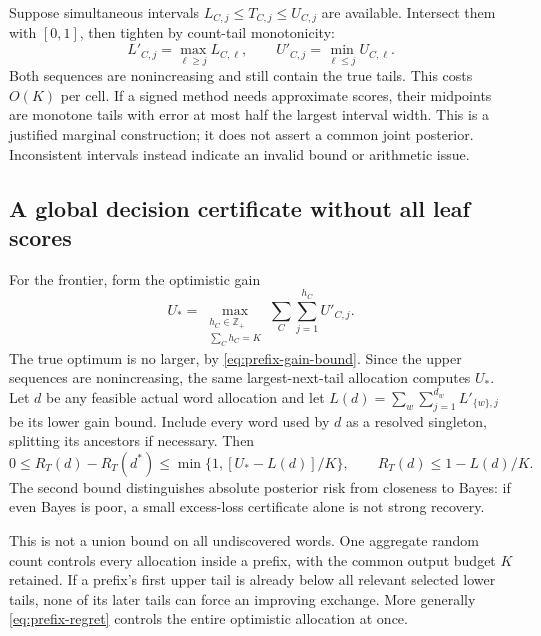 \documentclass[10pt,a4paper]{article}
\begin{document}
Suppose simultaneous intervals $L_{C,j}\leq T_{C,j}\leq U_{C,j}$ are available.
Intersect them with $[0,1]$, then tighten by count-tail monotonicity:
\[
 L'_{C,j}=\max_{\ell\geq j}L_{C,\ell},\qquad
 U'_{C,j}=\min_{\ell\leq j}U_{C,\ell}.
\]
Both sequences are nonincreasing and still contain the true tails. This costs $O(K)$ per cell.
If a signed method needs approximate scores, their midpoints are monotone tails with error at most
half the largest interval width. This is a justified marginal construction; it does not assert a common
joint posterior. Inconsistent intervals instead indicate an invalid bound or arithmetic issue.

\subsection{A global decision certificate without all leaf scores}
For the frontier, form the optimistic gain
\[
 U_*=\max_{\substack{h_C\in\mathbb Z_+\\\sum_C h_C=K}}
       \sum_C\sum_{j=1}^{h_C}U'_{C,j}.
\]
The true optimum is no larger, by \eqref{eq:prefix-gain-bound}. Since the upper sequences are nonincreasing,
the same largest-next-tail allocation computes $U_*$. Let $d$ be any feasible actual word allocation
and let $L(d)=\sum_w\sum_{j=1}^{d_w}L'_{\{w\},j}$ be its lower gain bound.
Include every word used by $d$ as a resolved singleton, splitting its ancestors if necessary. Then
\begin{equation}
 0\leq R_T(d)-R_T(d^*)\leq
       \min\{1,[U_*-L(d)]/K\},\qquad
 R_T(d)\leq1-L(d)/K.
 \label{eq:prefix-regret}
\end{equation}
The second bound distinguishes absolute posterior risk from closeness to Bayes: if even Bayes is poor,
a small excess-loss certificate alone is not strong recovery.

This is not a union bound on all undiscovered words. One aggregate random count controls every allocation
inside a prefix, with the common output budget $K$ retained. If a prefix's first upper tail is already below
all relevant selected lower tails, none of its later tails can force an improving exchange.
More generally \eqref{eq:prefix-regret} controls the entire optimistic allocation at once.
\end{document}
